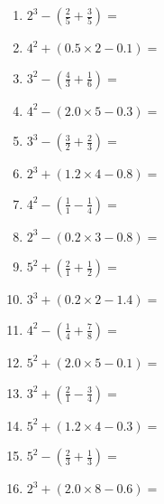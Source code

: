 \documentclass[12pt]{article}
\begin{document}
\begin{enumerate}
\item \large $ 2^{3} - (\frac{2}{5} + \frac{3}{5}) = $ \vspace{1.6cm}
\item \large $ 4^{2} + (0.5 \times 2 - 0.1) = $ \vspace{1.6cm}
\item \large $ 3^{2} - (\frac{4}{3} + \frac{1}{6}) = $ \vspace{1.6cm}
\item \large $ 4^{2} - (2.0 \times 5 - 0.3) = $ \vspace{1.6cm}
\item \large $ 3^{3} - (\frac{3}{2} + \frac{2}{3}) = $ \vspace{1.6cm}
\item \large $ 2^{3} + (1.2 \times 4 - 0.8) = $ \vspace{1.6cm}
\newpage
\item \large $ 4^{2} - (\frac{1}{1} - \frac{1}{4}) = $ \vspace{1.6cm}
\item \large $ 2^{3} - (0.2 \times 3 - 0.8) = $ \vspace{1.6cm}
\item \large $ 5^{2} + (\frac{2}{1} + \frac{1}{2}) = $ \vspace{1.6cm}
\item \large $ 3^{3} + (0.2 \times 2 - 1.4) = $ \vspace{1.6cm}
\item \large $ 4^{2} - (\frac{1}{4} + \frac{7}{8}) = $ \vspace{1.6cm}
\item \large $ 5^{2} + (2.0 \times 5 - 0.1) = $ \vspace{1.6cm}
\item \large $ 3^{2} + (\frac{2}{1} - \frac{3}{4}) = $ \vspace{1.6cm}
\item \large $ 5^{2} + (1.2 \times 4 - 0.3) = $ \vspace{1.6cm}
\item \large $ 5^{2} - (\frac{2}{3} + \frac{1}{3}) = $ \vspace{1.6cm}
\item \large $ 2^{3} + (2.0 \times 8 - 0.6) = $ \vspace{1.6cm}
\end{enumerate}\newpage
\end{document}
